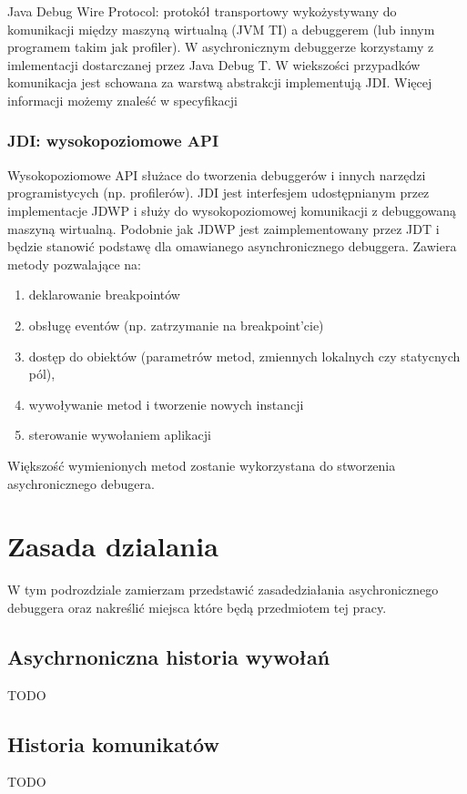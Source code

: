 Java Debug Wire Protocol: protokół transportowy wykożystywany do komunikacji między maszyną wirtualną (JVM TI) a debuggerem (lub innym programem takim jak profiler). W asychronicznym debuggerze korzystamy z imlementacji dostarczanej przez Java Debug T. W wiekszości przypadków komunikacja jest schowana za warstwą abstrakcji implementują JDI. Więcej informacji możemy znaleść w specyfikacji\cite{jwdpSpec}

\subsubsection{JDI: wysokopoziomowe API}

Wysokopoziomowe API służace do tworzenia debuggerów i innych narzędzi programistycych (np. profilerów). JDI jest interfesjem udostępnianym przez implementacje JDWP i służy do wysokopoziomowej komunikacji z debuggowaną maszyną wirtualną. Podobnie jak JDWP jest zaimplementowany przez JDT i będzie stanowić podstawę dla omawianego asynchronicznego debuggera.
Zawiera metody pozwalające na: \begin{enumerate}
\item deklarowanie breakpointów
\item obsługę eventów (np. zatrzymanie na breakpoint'cie)
\item dostęp do obiektów (parametrów metod, zmiennych lokalnych czy statycnych pól),
\item wywoływanie metod i tworzenie nowych instancji
\item sterowanie wywołaniem aplikacji
\end{enumerate} Większość wymienionych metod zostanie wykorzystana do stworzenia asychronicznego debugera.





\section{Zasada dzialania}

W tym podrozdziale zamierzam przedstawić zasadedziałania asychronicznego debuggera oraz nakreślić  miejsca które będą przedmiotem tej pracy.

\subsection{Asychrnoniczna historia wywołań}
TODO
\subsection{Historia komunikatów}
TODO
